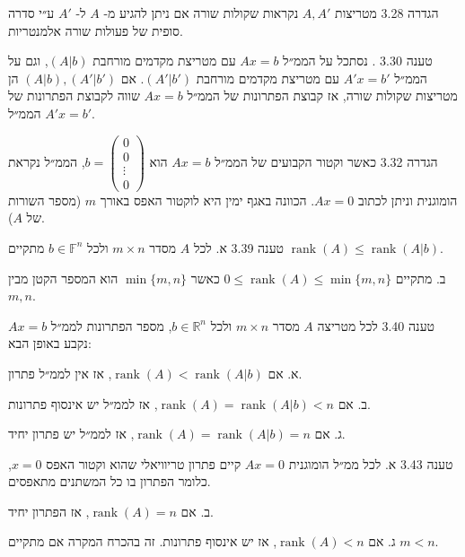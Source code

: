 \documentclass[a4paper, 11pt]{article}
\begin{document}
\begin{envbox}[defcolor]{הגדרה 3.28}
מטריצות $A,A'$ נקראות שקולות שורה אם ניתן להגיע מ- $A$ ל- $A'$ ע״י סדרה סופית של פעולות שורה אלמנטריות.
\end{envbox}

\begin{envbox}[thmcolor]{טענה 3.30}
. נסתכל על הממ״ל $Ax=b$ עם מטריצת מקדמים מורחבת $(A|b)$, וגם על הממ״ל $A'x=b'$ עם מטריצת מקדמים מורחבת $(A'|b')$. אם $(A|b),(A'|b')$ הן מטריצות שקולות שורה, אז קבוצת הפתרונות של הממ״ל $Ax=b$ שווה לקבוצת הפתרונות של הממ״ל $A'x=b'$.
\end{envbox}

\begin{envbox}[defcolor]{הגדרה 3.32}
כאשר וקטור הקבועים של הממ״ל $Ax=b$ הוא $b=\begin{pmatrix}0\\
0\\
\vdots\\
0
\end{pmatrix}$, הממ״ל נקראת הומוגנית וניתן לכתוב $Ax=0$. הכוונה באגף ימין היא לוקטור האפס באורך $m$ (מספר השורות של $A$).
\end{envbox}

\begin{envbox}[thmcolor]{טענה 3.39}
א. לכל $A$ מסדר $m\times n$ ולכל $b\in\mathbb F^n$ מתקיים $\mathop{\mathrm{rank}}(A)\leq\mathop{\mathrm{rank}}(A|b)$.

ב. מתקיים $0\leq\mathop{\mathrm{rank}}(A)\leq\min\{m,n\}$ כאשר $\min\{m,n\}$ הוא המספר הקטן מבין $m,n$.
\end{envbox}

\begin{envbox}[thmcolor]{טענה 3.40}
לכל מטריצה $A$ מסדר $m\times n$ ולכל $b\in\mathbb R^n$, מספר הפתרונות לממ״ל $Ax=b$ נקבע באופן הבא:

א. אם $\mathop{\mathrm{rank}}(A)<\mathop{\mathrm{rank}}(A|b)$, אז אין לממ״ל פתרון.

ב. אם $\mathop{\mathrm{rank}}(A)=\mathop{\mathrm{rank}}(A|b)<n$, אז לממ״ל יש אינסוף פתרונות.

ג. אם $\mathop{\mathrm{rank}}(A)=\mathop{\mathrm{rank}}(A|b)=n$, אז לממ״ל יש פתרון יחיד.
\end{envbox}

\begin{envbox}[thmcolor]{טענה 3.43}
א. לכל ממ״ל הומוגנית $Ax=0$ קיים פתרון טריוויאלי שהוא וקטור האפס $x=0$, כלומר הפתרון בו כל המשתנים מתאפסים.

ב. אם $\mathop{\mathrm{rank}}(A)=n$, אז הפתרון יחיד.

ג. אם $\mathop{\mathrm{rank}}(A)<n$, אז יש אינסוף פתרונות. זה בהכרח המקרה אם מתקיים $m<n$.
\end{envbox}
\end{document}
